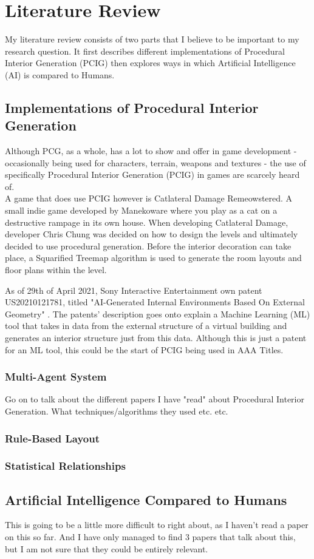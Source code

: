 \section{Literature Review}
My literature review consists of two parts that I believe to be important to my research question.
It first describes different implementations of Procedural Interior Generation (PCIG) then explores
ways in which Artificial Intelligence (AI) is compared to Humans.
\\
\subsection{Implementations of Procedural Interior Generation}
Although PCG, as a whole, has a lot to show and offer in game development - occasionally being used for
characters, terrain, weapons and textures - the use of specifically Procedural Interior Generation 
(PCIG) in games are scarcely heard  of.
\\
A game that does use PCIG however is Catlateral Damage Remeowstered\cite{game:catlateral}.
A small indie game developed by Manekoware where you play as a cat on a destructive rampage in its own house.
When developing Catlateral Damage, developer Chris Chung was decided on how to design the levels and ultimately decided to use procedural generation\cite{pcg_in_gd}.
Before the interior decoration can take place, a Squarified Treemap algorithm is used to generate the room layouts and floor plans within the level.

\bigskip
As of 29th of April 2021, Sony Interactive Entertainment own patent US20210121781, 
titled "AI-Generated Internal Environments Based On External Geometry" \cite{sony-patent}.
The patents' description goes onto explain a 
Machine Learning (ML) tool that takes in data from the external structure of a virtual building
and generates an interior structure just from this data.
Although this is just a patent for an ML tool, this could be the start of PCIG being used in AAA Titles. 



\subsubsection*{Multi-Agent System}
Go on to talk about the different papers I have "read" about Procedural Interior Generation.
What techniques/algorithms they used etc. etc. \cite{real-time-walkthroughs}
\subsubsection*{Rule-Based Layout}
\subsubsection*{Statistical Relationships}


\subsection{Artificial Intelligence Compared to Humans}
This is going to be a little more difficult to right about, as I haven't read a paper on this so far.
And I have only managed to find 3 papers that talk about this, but I am not sure that they could be entirely relevant.